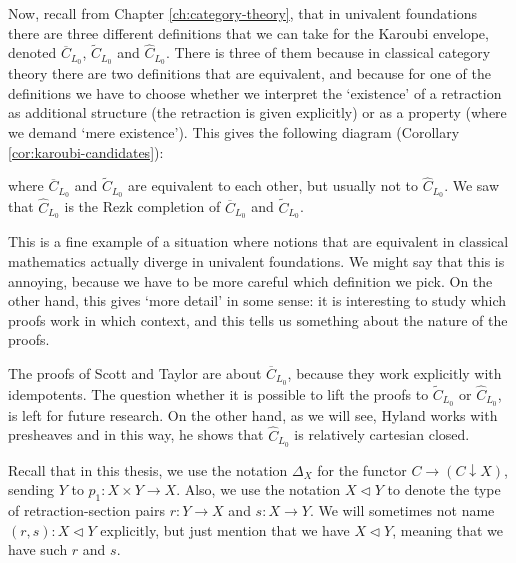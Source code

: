 Now, recall from Chapter \ref{ch:category-theory}, that in univalent foundations there are three different definitions that we can take for the Karoubi envelope, denoted $ \overline C_{L_0} $, $ \tilde C_{L_0} $ and $ \hat C_{L_0} $. There is three of them because in classical category theory there are two definitions that are equivalent, and because for one of the definitions we have to choose whether we interpret the `existence' of a retraction as additional structure (the retraction is given explicitly) or as a property (where we demand `mere existence'). This gives the following diagram (Corollary \ref{cor:karoubi-candidates}):
\begin{center}
\end{center}
where $ \overline C_{L_0} $ and $ \tilde C_{L_0} $ are equivalent to each other, but usually not to $ \hat C_{L_0} $. We saw that $ \hat C_{L_0} $ is the Rezk completion of $ \overline C_{L_0} $ and $ \tilde C_{L_0} $.

This is a fine example of a situation where notions that are equivalent in classical mathematics actually diverge in univalent foundations. We might say that this is annoying, because we have to be more careful which definition we pick. On the other hand, this gives `more detail' in some sense: it is interesting to study which proofs work in which context, and this tells us something about the nature of the proofs.

The proofs of Scott and Taylor are about $ \overline C_{L_0} $, because they work explicitly with idempotents. The question whether it is possible to lift the proofs to $ \tilde C_{L_0} $ or $ \hat C_{L_0} $, is left for future research. On the other hand, as we will see, Hyland works with presheaves and in this way, he shows that $ \hat C_{L_0} $ is relatively cartesian closed.

Recall that in this thesis, we use the notation $ \Delta_X $ for the functor $ C \to (C \downarrow X) $, sending $ Y $ to $ p_1 : X \times Y \to X $. Also, we use the notation $ X \triangleleft Y $ to denote the type of retraction-section pairs $ r: Y \to X $ and $ s: X \to Y $. We will sometimes not name $ (r, s) : X \triangleleft Y $ explicitly, but just mention that we have $ X \triangleleft Y $, meaning that we have such $ r $ and $ s $.

